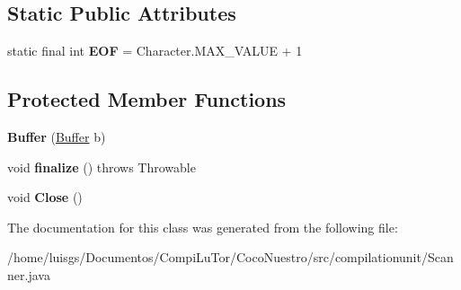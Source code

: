 \subsection*{Static Public Attributes}
\begin{DoxyCompactItemize}
\item 
\hypertarget{classcompilationunit_1_1_buffer_a50f26df022c5363463028448ea1d18de}{
static final int {\bfseries EOF} = Character.MAX\_\-VALUE + 1}
\label{classcompilationunit_1_1_buffer_a50f26df022c5363463028448ea1d18de}

\end{DoxyCompactItemize}
\subsection*{Protected Member Functions}
\begin{DoxyCompactItemize}
\item 
\hypertarget{classcompilationunit_1_1_buffer_af14f2e2b29e9235032721f9553292259}{
{\bfseries Buffer} (\hyperlink{classcompilationunit_1_1_buffer}{Buffer} b)}
\label{classcompilationunit_1_1_buffer_af14f2e2b29e9235032721f9553292259}

\item 
\hypertarget{classcompilationunit_1_1_buffer_a64bf273bbe04e45f074ea3665079e60d}{
void {\bfseries finalize} ()  throws Throwable }
\label{classcompilationunit_1_1_buffer_a64bf273bbe04e45f074ea3665079e60d}

\item 
\hypertarget{classcompilationunit_1_1_buffer_aed283593629db7169b383a216619726c}{
void {\bfseries Close} ()}
\label{classcompilationunit_1_1_buffer_aed283593629db7169b383a216619726c}

\end{DoxyCompactItemize}


The documentation for this class was generated from the following file:\begin{DoxyCompactItemize}
\item 
/home/luisgs/Documentos/CompiLuTor/CocoNuestro/src/compilationunit/Scanner.java\end{DoxyCompactItemize}
